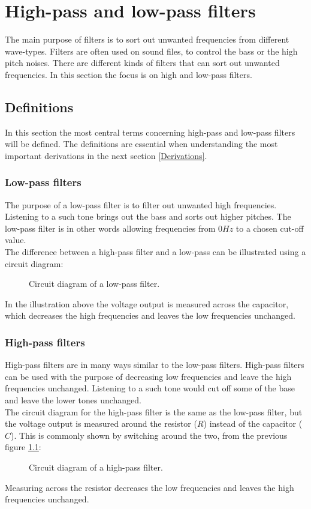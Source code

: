\chapter{High-pass and low-pass filters}
The main purpose of filters is to sort out unwanted frequencies from different wave-types. Filters are often used on sound files, to control the bass or the high pitch noises. There are different kinds of filters that can sort out unwanted frequencies. In this section the focus is on high and low-pass filters.
\section{Definitions}
In this section the most central terms concerning high-pass and low-pass filters will be defined. The definitions are essential when understanding the most important derivations in the next section \ref{Derivations}.
\subsection{Low-pass filters}
The purpose of a low-pass filter is to filter out unwanted high frequencies. Listening to a such tone brings out the bass and sorts out higher pitches. The low-pass filter is in other words allowing frequencies from $0Hz$ to a chosen cut-off value. \\
The difference between a high-pass filter and a low-pass can be illustrated using a circuit diagram:
\begin{figure}[H]
	
	\caption{Circuit diagram of a low-pass filter.} \label{lp:diagram}
\end{figure} 
In the illustration above the voltage output is measured across the capacitor, which decreases the high frequencies and leaves the low frequencies unchanged.  
\subsection{High-pass filters}
High-pass filters are in many ways similar to the low-pass filters. High-pass filters can be used with the purpose of decreasing low frequencies and leave the high frequencies unchanged. Listening to a such tone would cut off some of the base and leave the lower tones unchanged. \\
The circuit diagram for the high-pass filter is the same as the low-pass filter, but the voltage output is measured around the resistor ($R$) instead of the capacitor ($C$). This is commonly shown by switching around the two, from the previous figure \ref{lp:diagram}:
\begin{figure}[H]
	
	\caption{Circuit diagram of a high-pass filter.}
	\label{hp:diagram}
\end{figure} 
Measuring across the resistor decreases the low frequencies and leaves the high frequencies unchanged. 
